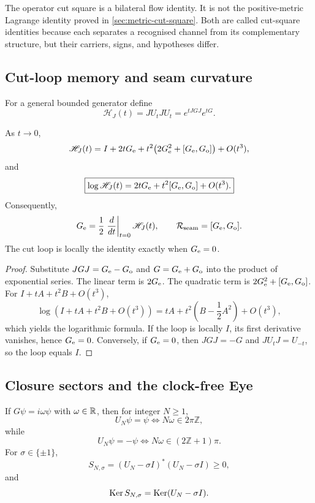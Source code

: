 \begin{remark}
The operator cut square is a bilateral flow identity. It is not the positive-metric Lagrange identity proved in \cref{sec:metric-cut-square}. Both are called cut-square identities because each separates a recognised channel from its complementary structure, but their carriers, signs, and hypotheses differ.
\end{remark}

\subsection{Cut-loop memory and seam curvature}

For a general bounded generator define
\[
 \mathscr H_J(t)=JU_tJU_t=e^{tJGJ}e^{tG}.
\]

\begin{theorem}\label{thm:t41loop}
As $t\to0$,
\[
 \mathscr H_J(t)
 =I+2tG_{\mathrm e}+t^2\bigl(2G_{\mathrm e}^2+[G_{\mathrm e},G_{\mathrm o}]\bigr)+O(t^3),
\]
and
\[
 \boxed{
 \log\mathscr H_J(t)
 =2tG_{\mathrm e}+t^2[G_{\mathrm e},G_{\mathrm o}]+O(t^3).}
\]
Consequently,
\[
 G_{\mathrm e}=\frac12\left.\frac{d}{dt}\right|_{t=0}\mathscr H_J(t),
 \qquad
 \mathcal R_{\mathrm{seam}}=[G_{\mathrm e},G_{\mathrm o}].
\]
The cut loop is locally the identity exactly when $G_{\mathrm e}=0$.
\end{theorem}

\begin{proof}
Substitute $JGJ=G_{\mathrm e}-G_{\mathrm o}$ and $G=G_{\mathrm e}+G_{\mathrm o}$ into the product of exponential series. The linear term is $2G_{\mathrm e}$. The quadratic term is $2G_{\mathrm e}^2+[G_{\mathrm e},G_{\mathrm o}]$. For $I+tA+t^2B+O(t^3)$,
\[
 \log(I+tA+t^2B+O(t^3))=tA+t^2\left(B-\frac12A^2\right)+O(t^3),
\]
which yields the logarithmic formula. If the loop is locally $I$, its first derivative vanishes, hence $G_{\mathrm e}=0$. Conversely, if $G_{\mathrm e}=0$, then $JGJ=-G$ and $JU_tJ=U_{-t}$, so the loop equals $I$.
\end{proof}

\subsection{Closure sectors and the clock-free Eye}

\begin{proposition}
If $G\psi=i\omega\psi$ with $\omega\in\mathbb R$, then for integer $N\ge1$,
\[
 U_N\psi=\psi \iff N\omega\in2\pi\mathbb Z,
\]
while
\[
 U_N\psi=-\psi \iff N\omega\in(2\mathbb Z+1)\pi.
\]
For $\sigma\in\{\pm1\}$,
\[
 S_{N,\sigma}=(U_N-\sigma I)^*(U_N-\sigma I)\ge0,
\]
and
\[
 \operatorname{Ker} S_{N,\sigma}=\operatorname{Ker}(U_N-\sigma I).
\]
\end{proposition}

